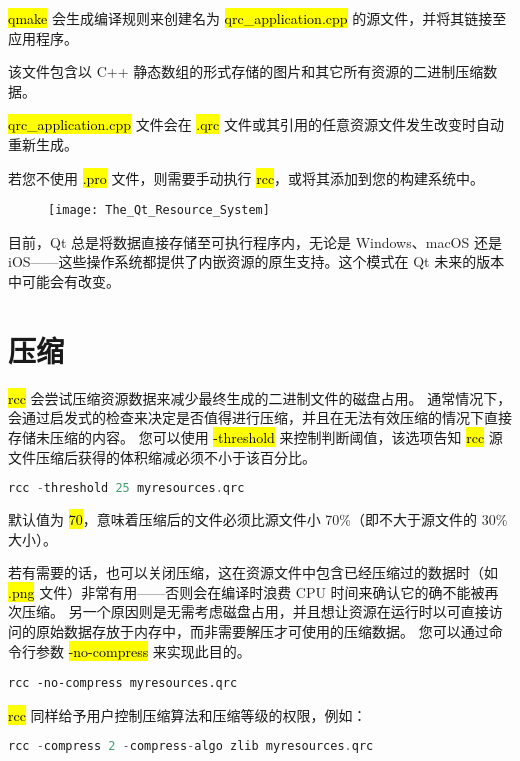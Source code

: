 \hl{qmake} 会生成编译规则来创建名为 \hl{qrc\_application.cpp} 的源文件，并将其链接至应用程序。

该文件包含以 C++ 静态数组的形式存储的图片和其它所有资源的二进制压缩数据。

\hl{qrc\_application.cpp} 文件会在 \hl{.qrc} 文件或其引用的任意资源文件发生改变时自动重新生成。

若您不使用 \hl{.pro} 文件，则需要手动执行 \hl{rcc}，或将其添加到您的构建系统中。

\begin{figure}[hbt!]  
	\centering
    \texttt{[image: The\_Qt\_Resource\_System]}
\end{figure}

目前，Qt 总是将数据直接存储至可执行程序内，无论是 Windows、macOS 还是 iOS——这些操作系统都提供了内嵌资源的原生支持。这个模式在 Qt 未来的版本中可能会有改变。

\section{压缩}

\hl{rcc} 会尝试压缩资源数据来减少最终生成的二进制文件的磁盘占用。
通常情况下，会通过启发式的检查来决定是否值得进行压缩，并且在无法有效压缩的情况下直接存储未压缩的内容。
您可以使用 \hl{-threshold} 来控制判断阈值，该选项告知 \hl{rcc} 源文件压缩后获得的体积缩减必须不小于该百分比。

\begin{lstlisting}[language=C++]   
rcc -threshold 25 myresources.qrc
\end{lstlisting}

默认值为 \hl{70}，意味着压缩后的文件必须比源文件小 70\%（即不大于源文件的 30\% 大小）。

若有需要的话，也可以关闭压缩，这在资源文件中包含已经压缩过的数据时（如 \hl{.png} 文件）非常有用——否则会在编译时浪费 CPU 时间来确认它的确不能被再次压缩。
另一个原因则是无需考虑磁盘占用，并且想让资源在运行时以可直接访问的原始数据存放于内存中，而非需要解压才可使用的压缩数据。
您可以通过命令行参数 \hl{-no-compress} 来实现此目的。

\begin{lstlisting}   
rcc -no-compress myresources.qrc
\end{lstlisting}

\hl{rcc} 同样给予用户控制压缩算法和压缩等级的权限，例如：

\begin{lstlisting}[language=C++]   
rcc -compress 2 -compress-algo zlib myresources.qrc
\end{lstlisting}

